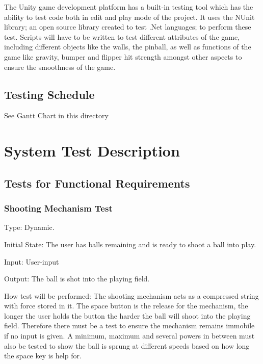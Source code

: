 \documentclass[12pt, titlepage]{article}
\begin{document}
The Unity game development platform has a built-in testing tool which has the ability to test code both in edit and play mode of the project. It uses the NUnit library; an open source library created to test .Net languages; to perform these test. Scripts will have to be written to test different attributes of the game, including different objects like the walls, the pinball, as well as functions of the game like gravity, bumper and flipper hit strength amongst other aspects to ensure the smoothness of the game. 



\subsection{Testing Schedule}
		
See Gantt Chart in this directory

\section{System Test Description}
	
\subsection{Tests for Functional Requirements}

\subsubsection{Shooting Mechanism Test}
		


Type: Dynamic.
					
Initial State: The user has balls remaining and is ready to shoot a ball into play.
				
Input: User-input

Output: The ball is shot into the playing field. 
					
How test will be performed: The shooting mechanism acts as a compressed string with force stored in it. The space button is the release for the mechanism, the longer the user holds the button the harder the ball will shoot into the playing field. Therefore there must be a test to ensure the mechanism remains immobile if no input is given. A minimum, maximum and several powers in between must also be tested to show the ball is sprung at different speeds based on how long the space key is help for.\\
\end{document}
